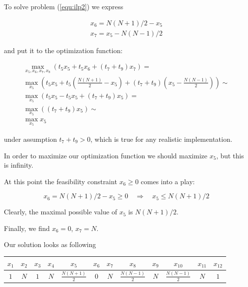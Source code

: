 \documentclass[12pt,a4paper,titlepage,oneside]{article}
\begin{document}
\begin{itemize}
To solve problem (\ref{equ:ilp2}) we express

\begin{equation*}
\left.\begin{aligned}
x_6 = N(N+1)/2 - x_5\\
x_7 = x_5 - N(N-1)/2
\end{aligned}\right.
\end{equation*}

and put it to the optimization function:

\begin{equation*}
\left.\begin{aligned}
\max_{x_5, x_6, x_7, x_8} \left(t_5x_5 + t_5x_6 + (t_7+t_9)x_7\right) =\\
\max_{x_5} \left(t_5x_5 + t_5\left(\frac{N(N+1)}2 - x_5\right) + (t_7+t_9)\left(x_5 - \frac{N(N-1)}2\right)\right) \sim\\
\max_{x_5} \left(t_5x_5 - t_5x_5 + (t_7+t_9)x_5\right) =\\
\max_{x_5} \left((t_7+t_9)x_5\right) \sim\\
\max_{x_5} x_5
\end{aligned}\right.
\end{equation*}

under assumption $t_7+t_9 > 0$, which is true for any realistic implementation.


In order to maximize our optimization function we should maximize $x_5$, but this is infinity.

At this point the feasibility constraint $x_6 \geq 0$ comes into a play:

\begin{equation*}
x_6 = N(N+1)/2 - x_5 \geq 0
\quad\Rightarrow\quad
x_5 \leq N(N+1)/2
\end{equation*}

Clearly, the maximal possible value of $x_5$ is $N(N+1)/2$.

Finally, we find $x_6 = 0$, $x_7 = N$.


Our solution looks as following\\

\begin{tabular}{c|c|c|c|c|c|c|c|c|c|c|c}
\hline
$x_1$ & $x_2$ & $x_3$ & $x_4$ & $x_5$ & $x_6$ & $x_7$ & $x_8$ & $x_9$ & $x_{10}$ & $x_{11}$ & $x_{12}$ \\
\hline
$1$ & $N$ & $1$ & $N$ & $\frac{N(N+1)}2$ & $0$ & $N$ & $\frac{N(N-1)}2$ & $N$ & $\frac{N(N-1)}2$ & $N$ & $1$ \\
\hline
\end{tabular}\\


\end{itemize}
\end{document}
